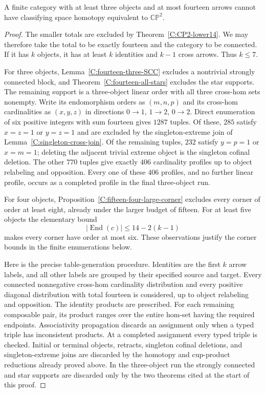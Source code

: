 \begin{theorem}
\label{C:fourteen-many-objects}
A finite category with at least three objects and at most fourteen
arrows cannot have classifying space homotopy equivalent to
$\mathbb {CP}^2$.
\end{theorem}
\begin{proof}
The smaller totals are excluded by Theorem~\ref{C:CP2-lower14}.
We may therefore take the total to be exactly fourteen and the
category to be connected.  If it has $k$ objects, it has at least
$k$ identities and $k-1$ cross arrows.  Thus $k\leq7$.

For three objects, Lemma~\ref{C:fourteen-three-SCC} excludes a
nontrivial strongly connected block, and
Theorem~\ref{C:fourteen-all-stars} excludes the star supports.
The remaining support is a three-object linear order with all
three cross-hom sets nonempty.  Write its endomorphism orders
as $(m,n,p)$ and its cross-hom cardinalities as $(x,y,z)$ in
directions $0\to1$, $1\to2$, $0\to2$.  Direct enumeration of
six positive integers with sum fourteen gives $1287$ tuples.
Of these, $285$ satisfy $x=z=1$ or $y=z=1$ and are excluded by
the singleton-extreme join of
Lemma~\ref{C:singleton-cross-join}.  Of the remaining tuples,
$232$ satisfy $y=p=1$ or $x=m=1$; deleting the adjacent
trivial extreme object is the singleton cofinal deletion.
The other $770$ tuples give exactly $406$ cardinality profiles
up to object relabeling and opposition.  Every one of these
$406$ profiles, and no further linear profile, occurs as a
completed profile in the final three-object run.

For four objects, Proposition~\ref{C:fifteen-four-large-corner}
excludes every corner of order at least eight, already under the
larger budget of fifteen.  For at least five objects the elementary
bound
\[
 |\operatorname{End}(c)|\leq14-2(k-1)
\]
makes every corner have order at most six.  These observations
justify the corner bounds in the finite enumerations below.

Here is the precise table-generation procedure.  Identities are
the first $k$ arrow labels, and all other labels are grouped by
their specified source and target.  Every connected nonnegative
cross-hom cardinality distribution and every positive diagonal
distribution with total fourteen is considered, up to object
relabeling and opposition.  The identity products are prescribed.
For each remaining composable pair, its product ranges over the
entire hom-set having the required endpoints.  Associativity
propagation discards an assignment only when a typed triple has
inconsistent products.  At a completed assignment every typed
triple is checked.  Initial or terminal objects, retracts,
singleton cofinal deletions, and singleton-extreme joins are
discarded by the homotopy and cup-product reductions already
proved above.  In the three-object run the strongly connected
and star supports are discarded only by the two theorems cited
at the start of this proof.


\end{proof}
